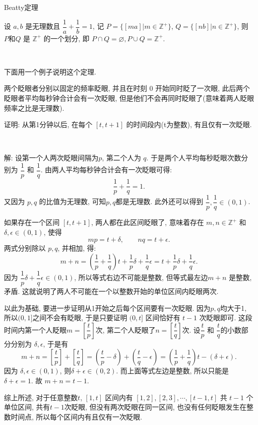 \newpage
\noindent Beatty定理

设 $a,b$ 是无理数且 $\dfrac{1}{a} + \dfrac{1}{b} = 1$, 记 $P = \{[ma] | m\in\mathbb{Z}^+\}$, $Q = \{[nb] | n\in\mathbb{Z}^+\}$, 则 $P$和$Q$ 是 $\mathbb{Z}^+$ 的一个划分, 即 $P\cap Q = \varnothing, P\cup Q = \mathbb{Z}^+$.

~

\noindent 下面用一个例子说明这个定理. 

两个眨眼者分别以固定的频率眨眼, 并且在时刻 0 开始同时眨了一次眼, 此后两个眨眼者平均每秒钟合计会有一次眨眼, 但是他们不会再同时眨眼了(意味着两人眨眼频率之比是无理数).

证明: 从第1分钟以后, 在每个 $[t,t+1]$ 的时间段内(t为整数), 有且仅有一次眨眼.

~

解: 设第一个人两次眨眼间隔为$p$, 第二个人为 $q$. 于是两个人平均每秒眨眼次数分别为 $\dfrac{1}{p}$ 和 $\dfrac{1}{q}$. 由两人平均每秒钟合计会有一次眨眼可得:
\[\frac{1}{p}+\frac{1}{q} = 1 .\]
又因为 $p,q$ 的比值为无理数, 可知$p,q$都是无理数. 此外还可以得到 $\dfrac{1}{p},\dfrac{1}{q}\in(0,1)$.

如果存在一个区间 $[t,t+1]$, 两人都在此区间眨眼了, 意味着存在 $m,n\in \mathbb{Z}^+$ 和 $\delta,\epsilon\in(0,1)$, 使得
\[mp = t + \delta, \qquad nq = t + \epsilon .\]
两式分别除以 $p,q$, 并相加, 得:
\[m+n = (\frac{1}{p} + \frac{1}{q})t + \frac{1}{p}\delta + \frac{1}{q}\epsilon = t + \frac{1}{p}\delta + \frac{1}{q}\epsilon .\]
因为 $\dfrac{1}{p}\delta + \dfrac{1}{q}\epsilon \in (0,1)$, 所以等式右边不可能是整数, 但等式最左边$m+n$ 是整数, 矛盾. 这就说明了两人不可能在一个以整数开始的单位区间内眨眼两次.

以此为基础, 要进一步证明从1开始之后每个区间要有一次眨眼. 因为$p,q$均大于1, 所以$(0,1]$之间不会有眨眼, 于是只要证明 $(0,t]$ 区间恰好有 $t-1$ 次眨眼即可. 这段时间内第一个人眨眼$m=\left[\dfrac{t}{p}\right]$次, 第二个人眨眼了$n=\left[\dfrac{t}{q}\right]$次. 设$\dfrac{t}{p}$ 和 $\dfrac{t}{q}$的小数部分分别为 $\delta,\epsilon$, 于是有
\[m+n = \left[\frac{t}{p}\right] + \left[\frac{t}{q}\right] = \left(\frac{t}{p} - \delta\right) + \left(\frac{t}{q} - \epsilon\right) = \left(\frac{1}{p}+\frac{1}{q}\right)t - (\delta+\epsilon) .\]
因为 $\delta,\epsilon\in(0,1)$, 则$\delta+\epsilon\in(0,2)$. 而上面等式左边是整数, 所以只能是 $\delta+\epsilon = 1$. 故 $m+n = t - 1$.

综上所述, 对于任意整数$t$, $[1,t]$ 区间内有 $[1,2], [2,3],\cdots,[t-1,t]$ 共 $t - 1$ 个单位区间, 共有$t - 1$次眨眼, 但没有两次眨眼在同一区间, 也没有任何眨眼发生在整数时间点, 所以每个区间内有且仅有一次眨眼.

